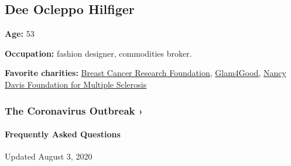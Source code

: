 \hypertarget{dee-ocleppo-hilfiger}{%
\subsection{Dee Ocleppo Hilfiger}\label{dee-ocleppo-hilfiger}}

\textbf{Age:} 53

\textbf{Occupation:} fashion designer, commodities broker.

\textbf{Favorite charities:} \href{https://www.bcrf.org}{Breast Cancer
Research Foundation}, \href{https://glam4good.com}{Glam4Good,}
\href{https://www.erasems.org}{Nancy Davis Foundation for Multiple
Sclerosis}

\href{https://www.nytimes.com/news-event/coronavirus?action=click\&pgtype=Article\&state=default\&region=MAIN_CONTENT_3\&context=storylines_faq}{}

\hypertarget{the-coronavirus-outbreak-}{%
\subsubsection{The Coronavirus Outbreak
›}\label{the-coronavirus-outbreak-}}

\hypertarget{frequently-asked-questions}{%
\paragraph{Frequently Asked
Questions}\label{frequently-asked-questions}}

Updated August 3, 2020

